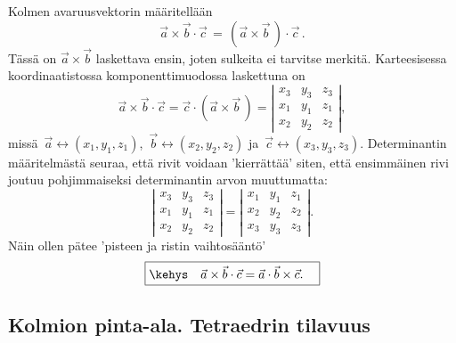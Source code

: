 Kolmen avaruusvektorin  määritellään
\[
\vec a \times \vec b \cdot \vec c \,=\, (\vec a \times \vec b\,) \cdot \vec c\,.
\]
Tässä on $\vec a \times \vec b$ laskettava ensin, joten sulkeita ei tarvitse merkitä. 
Karteesisessa koordinaatistossa komponenttimuodossa laskettuna on 
\[
\vec a \times \vec b \cdot \vec c = \vec c \cdot (\vec a \times \vec b\,) = 
\left| \begin{array}{ccc}
x_3 & y_3 & z_3 \\
x_1 & y_1 & z_1 \\
x_2 & y_2 & z_2 
\end{array} \right|,
\]
missä $\,\vec a \leftrightarrow (x_1,y_1,z_1)$, $\,\vec b \leftrightarrow (x_2,y_2,z_2)$ ja 
$\,\vec c \leftrightarrow (x_3,y_3,z_3)$. Determinantin määritelmästä seuraa, että rivit voidaan
'kierrättää' siten, että ensimmäinen rivi joutuu pohjimmaiseksi determinantin arvon muuttumatta:
\[
\left| \begin{array}{ccc}
x_3 & y_3 & z_3 \\
x_1 & y_1 & z_1 \\
x_2 & y_2 & z_2 
\end{array} \right| =
\left| \begin{array}{ccc}
x_1 & y_1 & z_1 \\
x_2 & y_2 & z_2 \\
x_3 & y_3 & z_3 
\end{array} \right|.
\]
Näin ollen pätee 'pisteen ja ristin vaihtosääntö'
\[
\boxed{\kehys\quad \vec a \times \vec b \cdot \vec c = \vec a \cdot \vec b \times \vec c. \quad}
\]

\subsection{Kolmion pinta-ala. Tetraedrin tilavuus}

